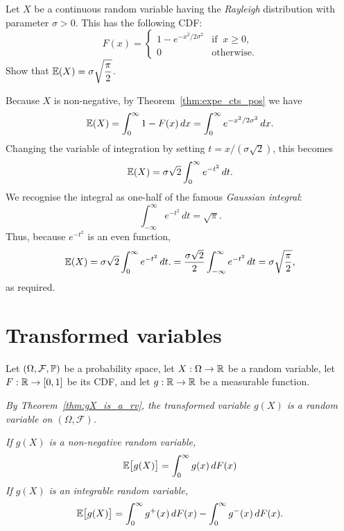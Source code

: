 \begin{example}
Let $X$ be a continuous random variable having the \emph{Rayleigh} distribution with parameter $\sigma>0$. This has the following CDF:
\[
F(x) = \begin{cases}
	1 - e^{-x^2/2\sigma^2}	& \text{if }\ x \geq 0, \\
	0																& \text{otherwise.}
\end{cases}	
\]
Show that $\mathbb{E}(X)=\displaystyle\sigma\sqrt{\frac{\pi}{2}}$.
\end{example}

\begin{solution}
Because $X$ is non-negative, by Theorem~\ref{thm:expe_cts_pos} we have
\[
\mathbb{E}(X) 
	= \int_0^\infty 1 - F(x)\,dx 
	= \int_0^\infty e^{-x^2/2\sigma^2} \,dx.
\]
Changing the variable of integration by setting $t=x/(\sigma\sqrt{2})$, this becomes
\[
\mathbb{E}(X) = \sigma\sqrt{2}\int_0^\infty e^{-t^2}\,dt.
\]
We recognise the integral as one-half of the famous \emph{Gaussian integral}:
\[
\int_{-\infty}^{\infty} e^{-t^2}\,dt = \sqrt{\pi}.
\]
Thus, because $e^{-t^2}$ is an even function,
\[
\mathbb{E}(X) 
	= \sigma\sqrt{2}\int_0^\infty e^{-t^2}\,dt.
	= \frac{\sigma\sqrt{2}}{2}\int_{-\infty}^\infty e^{-t^2}\,dt
	= \sigma\sqrt{\frac{\pi}{2}},
\]
as required.
\end{solution}

\section{Transformed variables}
Let $(\Omega,\mathcal{F},\mathbb{P})$ be a probability space, let $X:\Omega\to\mathbb{R}$ be a random variable, let $F:\mathbb{R}\to[0,1]$ be its CDF, and let $g:\mathbb{R}\to\mathbb{R}$ be a measurable function.

\bit
\it By Theorem~\ref{thm:gX_is_a_rv}, the transformed variable $g(X)$ is a random variable on $(\Omega,\mathcal{F})$.
\eit

\ben
\it If $g(X)$ is a non-negative random variable,
\[
\mathbb{E}\big[g(X)\big] = \int_0^{\infty} g(x)\,dF(x)
\]
\it If $g(X)$ is an integrable random variable,
\[
\mathbb{E}\big[g(X)\big] = \int_0^{\infty} g^{+}(x)\,dF(x) - \int_0^{\infty} g^{-}(x)\,dF(x).
\]
\een

